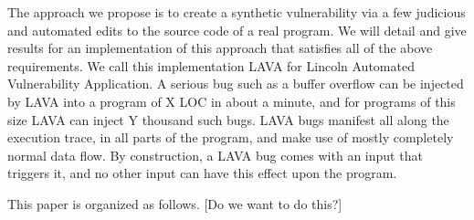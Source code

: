 The approach we propose is to create a synthetic vulnerability via a few judicious and automated edits to the source code of a real program.
We will detail and give results for an implementation of this approach that satisfies all of the above requirements.
We call this implementation LAVA for Lincoln Automated Vulnerability Application.
A serious bug such as a buffer overflow can be injected by LAVA into a program of X LOC in about a minute, and for programs of this size LAVA can inject  Y thousand such bugs.
LAVA bugs manifest all along the execution trace, in all parts of the program, and make use of mostly completely normal data flow.
By construction, a LAVA bug comes with an input that triggers it, and no other input can have this effect upon the program.

This paper is organized as follows. 
[Do we want to do this?]
